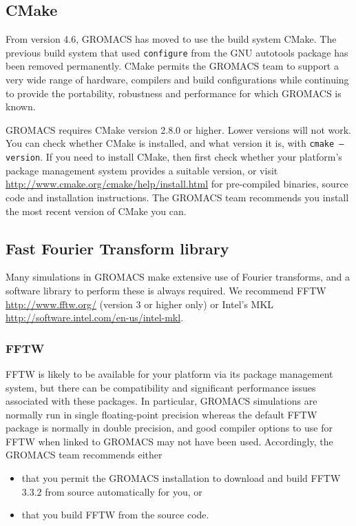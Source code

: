 \documentclass{article}[12pt,a4paper,twoside]
\newcommand{\gromacs}{GROMACS}
\newcommand{\fftw}{FFTW}
\newcommand{\mkl}{MKL}
\newcommand{\cmake}{CMake}
\newcommand{\fftwversion}{3.3.2}
\newcommand{\cmakeversion}{2.8.0}
\begin{document}
\subsection{CMake}

From version 4.6, \gromacs{} has moved to use the build system
\cmake{}. The previous build system that used \texttt{configure} from
the GNU autotools package has been removed permanently. \cmake{}
permits the \gromacs{} team to support a very wide range of hardware,
compilers and build configurations while continuing to provide the
portability, robustness and performance for which \gromacs{} is known.

\gromacs{} requires \cmake{} version \cmakeversion{} or higher. Lower
versions will not work. You can check whether \cmake{} is installed,
and what version it is, with \texttt{cmake --version}. If you need to
install \cmake{}, then first check whether your platform's package
management system provides a suitable version, or visit
\url{http://www.cmake.org/cmake/help/install.html} for pre-compiled
binaries, source code and installation instructions. The \gromacs{}
team recommends you install the most recent version of \cmake{} you
can.

\subsection{Fast Fourier Transform library}

Many simulations in \gromacs{} make extensive use of Fourier transforms,
and a software library to perform these is always required. We
recommend \fftw{} \url{http://www.fftw.org/} (version 3 or higher
only) or Intel's \mkl{}
\url{http://software.intel.com/en-us/intel-mkl}.

\subsubsection{\fftw{}}

\fftw{} is likely to be available for your platform via its package
management system, but there can be compatibility and significant
performance issues associated with these packages. In particular,
\gromacs{} simulations are normally run in single floating-point
precision whereas the default \fftw{} package is normally in double
precision, and good compiler options to use for \fftw{} when linked to
\gromacs{} may not have been used. Accordingly, the \gromacs{} team
recommends either
\begin{itemize}
\item that you permit the \gromacs{} installation to download and
  build \fftw{} \fftwversion{} from source automatically
  for you, or
\item that you build \fftw{} from the source code.
\end{itemize}
\end{document}
